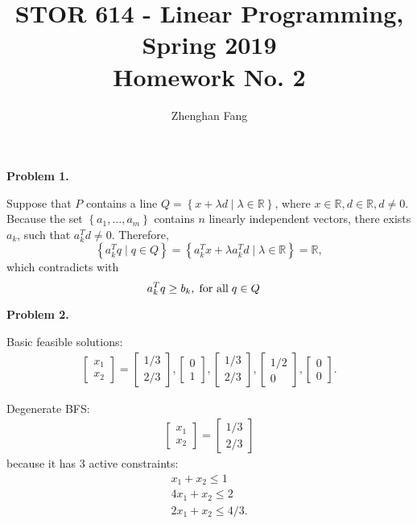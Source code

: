 \documentclass[12pt]{article}
\def\name{Zhenghan Fang}
\begin{document}
 
 
\title{STOR 614 - Linear Programming, Spring 2019 \\
Homework No. 2}
\author{\name}

\maketitle

\noindent
\textbf{Problem 1.}

Suppose that $P$ contains a line $Q = \left\{ x+ \lambda d \mid \lambda \in \mathbb{R} \right\}$, where $x\in \mathbb{R}, d\in \mathbb{R}, d \ne 0$. Because the set $\left\{ a_1, \hdots, a_m \right\}$ contains $n$ linearly independent vectors, there exists $a_k$, such that $a_k^T d \ne 0$. Therefore,
$$\left\{ a_k^T q \mid q \in Q \right\} = \left\{ a_k^T x + \lambda a_k^T d \mid \lambda \in \mathbb{R} \right\} = \mathbb{R} , $$ which contradicts with $$a_k^T q \ge b_k, \text{\;for all\;} q\in Q \quad$$

\vspace{\baselineskip}
\noindent
\textbf{Problem 2.}

Basic feasible solutions:
\begin{gather*}
    \begin{bmatrix} x_1 \\ x_2 \end{bmatrix} = 
    \begin{bmatrix} 1/3 \\ 2/3 \end{bmatrix}, 
    \begin{bmatrix} 0 \\ 1 \end{bmatrix},
    \begin{bmatrix} 1/3 \\ 2/3 \end{bmatrix},
    \begin{bmatrix} 1/2 \\ 0 \end{bmatrix},
    \begin{bmatrix} 0 \\ 0 \end{bmatrix}.
\end{gather*}

Degenerate BFS:
\begin{align*}
    \begin{bmatrix} x_1 \\ x_2 \end{bmatrix} = 
    \begin{bmatrix} 1/3 \\ 2/3 \end{bmatrix}
\end{align*}
because it has 3 active constraints:
\begin{gather*}
    x_1+x_2 \le 1 \\ 4x_1 + x_2 \le 2 \\ 2x_1 +x_2 \le 4/3 .
\end{gather*}
\end{document}
